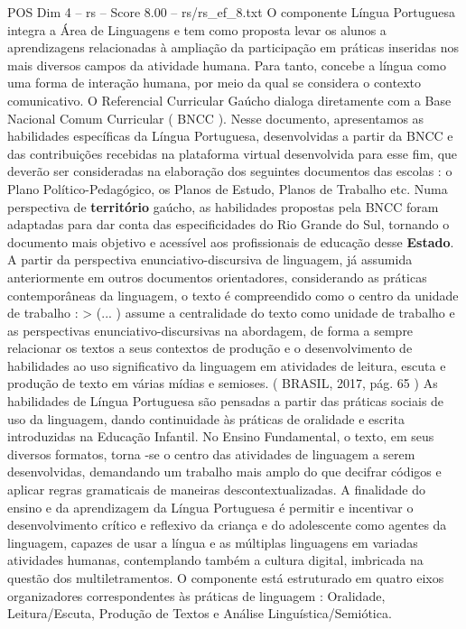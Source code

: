 \begin{textsample}{POS Dim 4 – rs – Score 8.00 – rs/rs\_ef\_8.txt}  \label{ex:f4_pos_098}
O componente Língua Portuguesa integra a Área de Linguagens e tem como proposta levar os alunos a aprendizagens relacionadas à ampliação da participação em práticas inseridas nos mais diversos campos da atividade humana.
Para tanto, concebe a língua como uma forma de interação humana, por meio da qual se considera o contexto comunicativo.
O Referencial Curricular Gaúcho dialoga diretamente com a Base Nacional Comum Curricular ( BNCC ).
Nesse documento, apresentamos as habilidades específicas da Língua Portuguesa, desenvolvidas a partir da BNCC e das contribuições recebidas na plataforma virtual desenvolvida para esse fim, que deverão ser consideradas na elaboração dos seguintes documentos das escolas : o Plano Político-Pedagógico, os Planos de Estudo, Planos de Trabalho etc.
Numa perspectiva de \textbf{território} gaúcho, as habilidades propostas pela BNCC foram adaptadas para dar conta das especificidades do Rio Grande do Sul, tornando o documento mais objetivo e acessível aos profissionais de educação desse \textbf{Estado}.
A partir da perspectiva enunciativo-discursiva de linguagem, já assumida anteriormente em outros documentos orientadores, considerando as práticas contemporâneas da linguagem, o texto é compreendido como o centro da unidade de trabalho : > (... ) assume a centralidade do texto como unidade de trabalho e as perspectivas enunciativo-discursivas na abordagem, de forma a sempre relacionar os textos a seus contextos de produção e o desenvolvimento de habilidades ao uso significativo da linguagem em atividades de leitura, escuta e produção de texto em várias mídias e semioses. ( BRASIL, 2017, pág. 65 ) As habilidades de Língua Portuguesa são pensadas a partir das práticas sociais de uso da linguagem, dando continuidade às práticas de oralidade e escrita introduzidas na Educação Infantil.
No Ensino Fundamental, o texto, em seus diversos formatos, torna -se o centro das atividades de linguagem a serem desenvolvidas, demandando um trabalho mais amplo do que decifrar códigos e aplicar regras gramaticais de maneiras descontextualizadas.
A finalidade do ensino e da aprendizagem da Língua Portuguesa é permitir e incentivar o desenvolvimento crítico e reflexivo da criança e do adolescente como agentes da linguagem, capazes de usar a língua e as múltiplas linguagens em variadas atividades humanas, contemplando também a cultura digital, imbricada na questão dos multiletramentos.
O componente está estruturado em quatro eixos organizadores correspondentes às práticas de linguagem : Oralidade, Leitura/Escuta, Produção de Textos e Análise Linguística/Semiótica.

\end{textsample}
